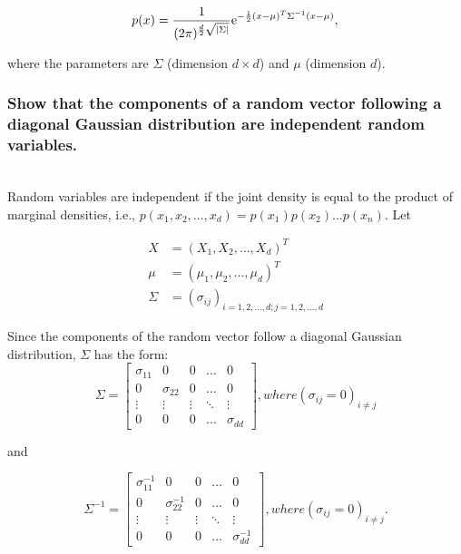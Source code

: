 \documentclass{amsart}
\theoremstyle{definition}
\theoremstyle{remark}
\numberwithin{equation}{section}
\begin{document}
\begin{equation}
    p(x) = \frac{1}{(2\pi)^{\frac{d}{2} \sqrt{|\Sigma|}}} {\rm e}^{-\frac{1}{2}(x-\mu)^T \Sigma^{-1} (x-\mu)}, \\
\end{equation}

where the parameters are $\Sigma$ (dimension $d \times d$) and $\mu$ (dimension $d$). \\

\subsubsection{Show that the components of a random vector following a diagonal 
Gaussian distribution are independent random variables.} \\

Random variables are independent if the joint density is equal to the product of
marginal densities, i.e., $p(x_1, x_2, ..., x_d) = p(x_1)p(x_2)...p(x_n)$. Let 

\begin{equation}
    \begin{align}
    X & = (X_1, X_2, ..., X_d)^T \\
    \mu & = (\mu_1, \mu_2, ..., \mu_d)^T \\ 
    \Sigma & = (\sigma_{ij})_{i=1,2,...,d; j=1,2,...,d}
    \end{align}
\end{equation}

Since the components of the random vector follow a diagonal Gaussian distribution,
$\Sigma$ has the form: \\

\begin{equation}
    \Sigma = \begin{bmatrix}
        \sigma_{11} &           0 &      0 & \dots  & 0 \\
                  0 & \sigma_{22} &      0 & \dots  & 0 \\
             \vdots &      \vdots & \vdots & \ddots & \vdots \\
                  0 &           0 &      0 & \dots  & \sigma_{dd}
    \end{bmatrix}, where (\sigma_{ij}=0)_{i \neq j}
\end{equation}

and

\begin{equation}
    \Sigma^{-1} = \begin{bmatrix}
        \sigma_{11}^{-1} &           0 &      0 & \dots  & 0 \\
                  0 & \sigma_{22}^{-1} &      0 & \dots  & 0 \\
             \vdots &      \vdots & \vdots & \ddots & \vdots \\
                  0 &           0 &      0 & \dots  & \sigma_{dd}^{-1}
    \end{bmatrix}, where (\sigma_{ij}=0)_{i \neq j}.
\end{equation}\\
\end{document}
